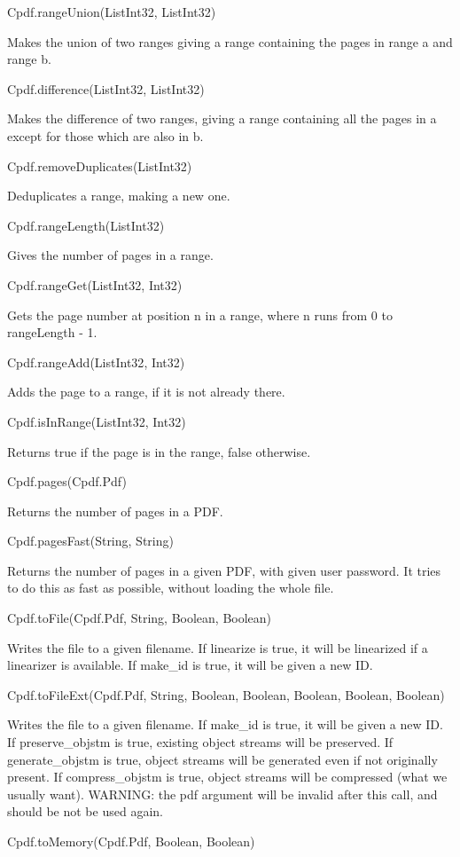 Cpdf.rangeUnion(List{Int32}, List{Int32})

Makes the union of two ranges giving a range
containing the pages in range a and range b.

Cpdf.difference(List{Int32}, List{Int32})

Makes the difference of two ranges, giving a range
containing all the pages in a except for those which are also in b.

Cpdf.removeDuplicates(List{Int32})

Deduplicates a range, making a new one.

Cpdf.rangeLength(List{Int32})

Gives the number of pages in a range.

Cpdf.rangeGet(List{Int32}, Int32)

Gets the page number at position n in a range, 
where n runs from 0 to rangeLength - 1.

Cpdf.rangeAdd(List{Int32}, Int32)

Adds the page to a range, if it is not already
there.

Cpdf.isInRange(List{Int32}, Int32)

Returns true if the page is in the range, 
false otherwise.

Cpdf.pages(Cpdf.Pdf)

Returns the number of pages in a PDF.

Cpdf.pagesFast(String, String)

Returns the number of pages in a given
PDF, with given user password. It tries to do this as fast as
possible, without loading the whole file.

Cpdf.toFile(Cpdf.Pdf, String, Boolean, Boolean)

Writes the file to a given
filename. If linearize is true, it will be linearized if a linearizer is
available. If make_id is true, it will be given a new ID.

Cpdf.toFileExt(Cpdf.Pdf, String, Boolean, Boolean, Boolean, Boolean, Boolean)

Writes the file to a given filename. If
make_id is true, it will be given a new ID.  If preserve_objstm is true, 
existing object streams will be preserved. If generate_objstm is true, 
object streams will be generated even if not originally present. If
compress_objstm is true, object streams will be compressed (what we
usually want). WARNING: the pdf argument will be invalid after this call, 
and should be not be used again.

Cpdf.toMemory(Cpdf.Pdf, Boolean, Boolean)

